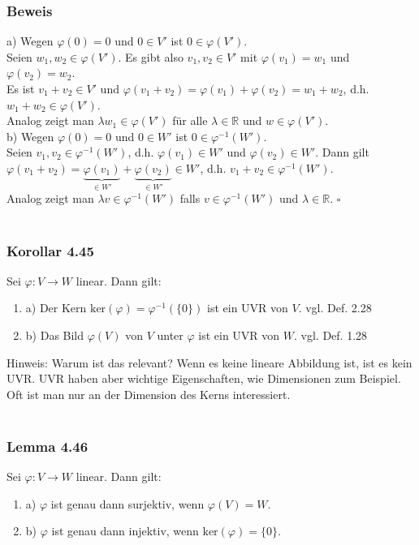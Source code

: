 \documentclass{article}
\begin{document}
\subsubsection*{Beweis}
a) Wegen $\varphi(0) = 0$ und $0 \in V'$ ist $0 \in \varphi(V')$. \\
Seien $w_1, w_2 \in \varphi(V')$. Es gibt also $v_1, v_2 \in V'$ mit $\varphi(v_1) = w_1$ und $\varphi(v_2) = w_2$. \\
Es ist $v_1 + v_2 \in V'$ und $\varphi(v_1 + v_2) = \varphi(v_1) + \varphi(v_2) = w_1 + w_2$, d.h. $w_1 + w_2 \in \varphi(V')$. \\
Analog zeigt man $\lambda w_1 \in \varphi(V')$ für alle $\lambda \in \mathbb{R}$ und $w \in \varphi(V')$. \\
b) Wegen $\varphi(0) = 0$ und $0 \in W'$ ist $0 \in \varphi^{-1}(W')$. \\
Seien $v_1, v_2 \in \varphi^{-1}(W')$, d.h. $\varphi(v_1) \in W'$ und $\varphi(v_2) \in W'$. 
Dann gilt $\varphi(v_1 + v_2) = \underbrace{\varphi(v_1)}_{\in W'} + \underbrace{\varphi(v_2)}_{\in W'} \in W'$, d.h. $v_1 + v_2 \in \varphi^{-1}(W')$. \\
Analog zeigt man $\lambda v \in \varphi^{-1}(W')$ falls $v \in \varphi^{-1}(W')$ und $\lambda \in \mathbb{R}$. $\square$ \\
\\
\subsubsection*{Korollar 4.45}
Sei $\varphi: V \rightarrow W$ linear. Dann gilt: \\
\begin{enumerate}
    \item a) Der Kern $\text{ker}(\varphi) = \varphi^{-1}(\{0\})$ ist ein UVR von $V$. vgl. Def. 2.28 \\
    \item b) Das Bild $\varphi(V)$ von $V$ unter $\varphi$ ist ein UVR von $W$. vgl. Def. 1.28 \\
\end{enumerate}
Hinweis: Warum ist das relevant? Wenn es keine lineare Abbildung ist, ist es kein UVR. UVR haben aber wichtige Eigenschaften, wie Dimensionen zum Beispiel. Oft ist man nur an der Dimension des Kerns interessiert. \\
\\
\subsubsection*{Lemma 4.46}
Sei $\varphi: V \rightarrow W$ linear. Dann gilt: \\
\begin{enumerate}
    \item a) $\varphi$ ist genau dann surjektiv, wenn $\varphi(V) = W$. \\
    \item b) $\varphi$ ist genau dann injektiv, wenn $\text{ker}(\varphi) = \{0\}$. \\
\end{enumerate}
\end{document}
